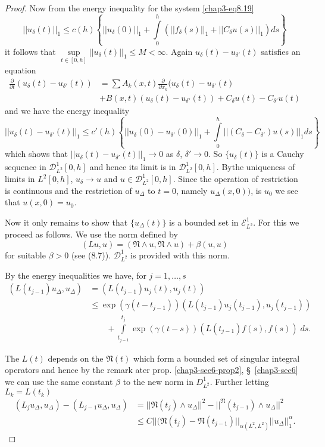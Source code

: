 \begin{proof}
Now from the energy inequality for the system \eqref{chap3-eq8.19}  
$$
|| u_{\delta} (t) ||_1 \leq c(h) \left\{ || u_{\delta} (0) ||_1 + 
\int\limits^h_0 (||f_{\delta} (s) ||_1 + ||C_\delta u(s)||_1 ) ds \right\} 
$$
it follows that $\sup\limits_{t \in [0, h]}|| u_{\delta} (t)
||_1 \leq M < \infty$. Again $u_{\delta} (t) - u_{\delta'}(t)$
satisfies an equation 
\begin{align*}
\frac{\partial}{\partial t} (u_{\delta} (t) - u_{\delta'} (t)) & = \sum
A_k (x, t) \frac{\partial}{\partial x_k} (u_{\delta} (t) - u_{\delta'}
(t)\\ 
& + B(x, t) (u_{\delta}(t) -u_{\delta'} (t)) + C_{\delta} u(t) -
C_{\delta'} u(t) 
\end{align*}
and we have the energy inequality 
$$
|| u_{\delta} (t) - u_{\delta'}(t) ||_1 \leq c'(h) \left\{ || u_{\delta}(0)
- u_{\delta'} (0) ||_1 + \int\limits^h_0 ||(C_{\delta} - C_{\delta'}) u
(s)||_1 ds \right\} 
$$
which shows that $|| u_{\delta} (t) - u_{\delta'} (t) ||_1 \to 0$ as
${\delta}$, $\delta' \to 0$. So $\{ u_{\delta} (t) \}$ is a Cauchy
sequence in $\mathscr{D}^1_{L^2} [0, h]$ and hence its limit is in
$\mathscr{D}^1_{L^2} [0, h]$. 
By\pageoriginale the uniqueness of limits in $L^2 [0, h]$, $u_{\delta}
\to u$ and $u 
\in \mathscr{D}^1_{L^2} [0, h]$. Since the operation of
restriction is continuous and the restriction of $u_{\Delta}$ to $t =
0$, namely $u_{\Delta} (x, 0))$, is $u_0$ we see that $u(x, 0) =
u_0$. 

Now it only remains to show that $\{ u_{\Delta} (t) \}$ is a bounded
set in $\mathscr{E}^1_{L^2}$. For this we proceed as follows. We use
the norm defined by  
$$
(Lu, u) = (\mathfrak{N} \wedge u, \mathfrak{N} \wedge u) + \beta (u, u) 
$$
for suitable $\beta > 0$ (see (8.7)). $\mathscr{D}^1_{L^2}$ is
provided with this norm. 

By the energy inequalities we have, for $j = 1,\ldots, s$
\begin{align*}
(L (t_{j-1}) u_{\Delta}, u_{\Delta}) & = (L(t_{j-1}) u_j (t), u_j(t))
  \tag{8.21}\label{chap3-eq8.21}\\ 
& \leq \exp (\gamma( t -t_{j-1})) (L (t_{j-1}) u_j (t_{j-1}), u_j
  (t_{j-1}))\\ 
& \qquad + \int\limits^{t_j}_{t_{j-1}} \exp ( \gamma (t-s)) (L(t_{j-1})
  f(s), f(s)) \; ds. 
\end{align*}

The $L(t)$ depends on the $\mathfrak{N} (t)$ which form a bounded set
of singular integral operators and hence by the remark ater
prop. \ref{chap3-sec6-prop2}, \S\ \ref{chap3-sec6}
we can use the same constant $\beta$ to the new norm in
$D^{1}_{L^{2}}$. Further letting $L_{k}=L(t_{k})$
\begin{align*}
(L_j u_{\Delta}, u_{\Delta}) - (L_{j-1} u_{\Delta}, u_{\Delta}) & = ||
  \mathfrak{N} (t_j) \wedge u_{\Delta} ||^2 - ||^{\mathfrak{N}}
  (t_{j-1}) \wedge u_{\Delta} ||^2 \\ 
& \leq C|| (\mathfrak{N} (t_j) - \mathfrak{N}(t_{j-1})||_{\alpha (L^2,
    L^2)}|| u_{\Delta}||^{\alpha}_1. 
\end{align*}


\end{proof}
